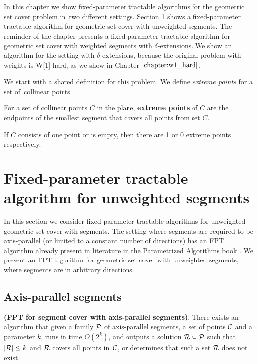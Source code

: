 In this chapter we show fixed-parameter tractable algorithms
for the geometric set cover problem in~two different settings.
Section \ref{section:fpt_unweighted} shows 
a fixed-parameter tractable algorithm for geometric set cover with unweighted segments.
The reminder of the chapter presents
a fixed-parameter tractable algorithm for geometric set cover with weighted segments
with $\delta$-extensions.
We show an algorithm for the setting with $\delta$-extensions,
because the original problem with weights is W[1]-hard,
as we show in Chapter $\ref{chapter:w1_hard}$.

We start with a shared definition for this problem.
We define \textit{extreme points} for a set of~collinear points.

\begin{defi}
	For a set of collinear points $C$ in the plane,
	\textbf{extreme points} of $C$ are the endpoints
	of the smallest segment that covers all points from set $C$.
	
	If $C$ consists of one point or is empty, then
	there are 1 or 0 extreme points respectively.
\end{defi}

\section{Fixed-parameter tractable algorithm for unweighted segments}
\label{section:fpt_unweighted}
In this section we consider fixed-parameter tractable
algorithms for unweighted geometric set cover with segments.
The setting where segments are required to be axis-parallel
(or limited to a constant number of directions) has an FPT
algorithm already present in literature in
the Parametrized Algorithms book \cite{platypus_book}.
We present an FPT algorithm for geometric set cover
with unweighted segments, where segments are in arbitrary directions.

\subsection{Axis-parallel segments}
\begin{tw}
	\textbf{(FPT for segment cover with axis-parallel segments)}.
	There exists an algorithm that given a family $\mathcal{P}$ of
	axis-parallel segments,
	a set of points $\mathcal{C}$
	and a parameter $k$,
	runs in time $O(2^k)$,
	and outputs a solution $\mathcal{R} \subseteq \mathcal{P}$
	such that $|\mathcal{R}| \le k$ and $\mathcal{R}$ covers all points in~$\mathcal{C}$,
	or determines that such a set $\mathcal{R}$ does not exist.
\end{tw}


